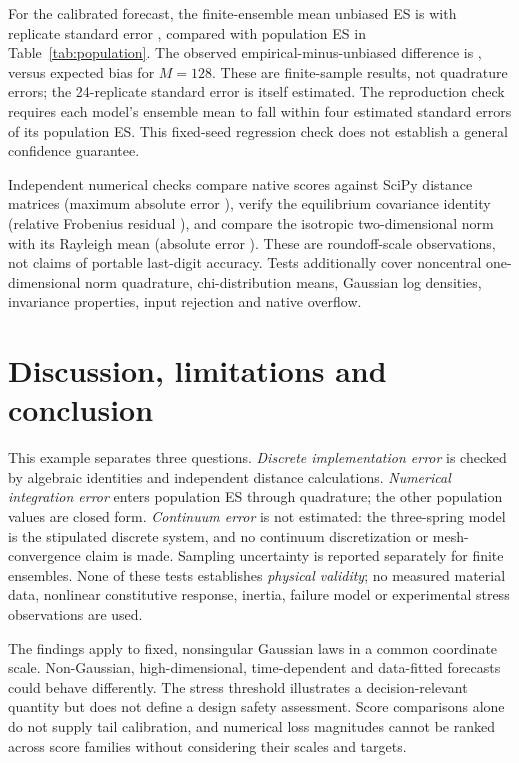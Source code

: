 \documentclass[10pt,a4paper]{article}
\begin{document}
For the calibrated forecast, the finite-ensemble mean unbiased ES is
\CalibratedMC{} with replicate standard error \CalibratedSE{}, compared with
population ES in Table~\ref{tab:population}. The observed empirical-minus-unbiased
difference is \BiasObserved{}, versus expected bias \BiasExpected{} for $M=128$.
These are finite-sample results, not quadrature errors; the 24-replicate standard
error is itself estimated. The reproduction check requires each model's ensemble
mean to fall within four estimated standard errors of its population ES. This
fixed-seed regression check does not establish a general confidence guarantee.

Independent numerical checks compare native scores against SciPy distance
matrices (maximum absolute error \texttt{\NativeError}), verify the equilibrium
covariance identity (relative Frobenius residual \texttt{\EquilibriumError}),
and compare the isotropic two-dimensional norm with its Rayleigh mean
(absolute error \texttt{\NormError}). These are roundoff-scale observations,
not claims of portable last-digit accuracy. Tests additionally cover
noncentral one-dimensional norm quadrature, chi-distribution means, Gaussian
log densities, invariance properties, input rejection and native overflow.

\section{Discussion, limitations and conclusion}
This example separates three questions. \emph{Discrete implementation error}
is checked by algebraic identities and independent distance calculations.
\emph{Numerical integration error} enters population ES through quadrature;
the other population values are closed form. \emph{Continuum error} is not
estimated: the three-spring model is the stipulated discrete system, and no
continuum discretization or mesh-convergence claim is made. Sampling uncertainty
is reported separately for finite ensembles. None of these tests establishes
\emph{physical validity}; no measured material data, nonlinear constitutive
response, inertia, failure model or experimental stress observations are used.

The findings apply to fixed, nonsingular Gaussian laws in a common coordinate
scale. Non-Gaussian, high-dimensional, time-dependent and data-fitted forecasts
could behave differently. The stress threshold illustrates a decision-relevant
quantity but does not define a design safety assessment. Score comparisons alone
do not supply tail calibration, and numerical loss magnitudes cannot be ranked
across score families without considering their scales and targets.
\end{document}
